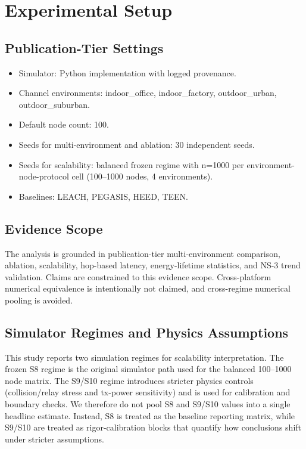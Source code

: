 \documentclass[sensors,article,submit,moreauthors,pdftex]{Definitions/mdpi}
\begin{document}
\section{Experimental Setup}
\subsection{Publication-Tier Settings}
\begin{itemize}
\item Simulator: Python implementation with logged provenance.
\item Channel environments: indoor\_office, indoor\_factory, outdoor\_urban, outdoor\_suburban.
\item Default node count: 100.
\item Seeds for multi-environment and ablation: 30 independent seeds.
\item Seeds for scalability: balanced frozen regime with n=1000 per environment-node-protocol cell (100--1000 nodes, 4 environments).
\item Baselines: LEACH, PEGASIS, HEED, TEEN.
\end{itemize}

\subsection{Evidence Scope}
The analysis is grounded in publication-tier multi-environment comparison, ablation, scalability, hop-based latency, energy-lifetime statistics, and NS-3 trend validation. Claims are constrained to this evidence scope. Cross-platform numerical equivalence is intentionally not claimed, and cross-regime numerical pooling is avoided.

\subsection{Simulator Regimes and Physics Assumptions}
This study reports two simulation regimes for scalability interpretation. The frozen S8 regime is the original simulator path used for the balanced 100--1000 node matrix. The S9/S10 regime introduces stricter physics controls (collision/relay stress and tx-power sensitivity) and is used for calibration and boundary checks. We therefore do not pool S8 and S9/S10 values into a single headline estimate. Instead, S8 is treated as the baseline reporting matrix, while S9/S10 are treated as rigor-calibration blocks that quantify how conclusions shift under stricter assumptions.
\end{document}
